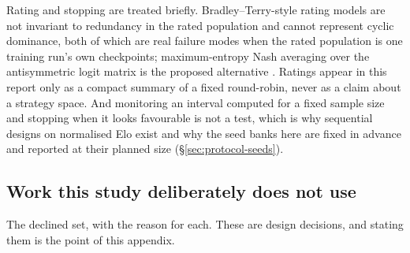 Rating and stopping are treated briefly. Bradley--Terry-style rating models
\cite{coulom-whr,herbrich-trueskill} are not invariant to redundancy in the
rated population and cannot represent cyclic dominance, both of which are real
failure modes when the rated
population is one training run's own checkpoints; maximum-entropy Nash averaging
over the antisymmetric logit matrix is the proposed alternative
\cite{balduzzi-reeval}. Ratings appear in this report only as a compact summary
of a fixed round-robin, never as a claim about a strategy space. And monitoring
an interval computed for a fixed sample size and stopping when it looks
favourable is not a test, which is why sequential designs on normalised Elo
exist \cite{nelo} and why the seed banks here are fixed in advance and reported
at their planned size (\S\ref{sec:protocol-seeds}).

\subsection{Work this study deliberately does not use}
\label{app:rel-declined}

The declined set, with the reason for each. These are design decisions, and
stating them is the point of this appendix.

